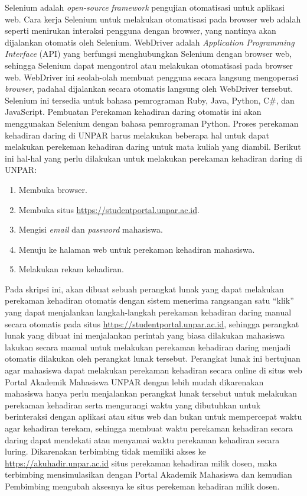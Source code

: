 Selenium adalah \textit{open-source} \textit{framework} pengujian otomatisasi untuk aplikasi web\cite{selenium}. Cara kerja Selenium untuk melakukan otomatisasi pada browser web adalah seperti menirukan interaksi pengguna dengan browser, yang nantinya akan dijalankan otomatis oleh Selenium. WebDriver adalah \textit{Application Programming Interface} (API) yang berfungsi menghubungkan Selenium dengan browser web, sehingga Selenium dapat mengontrol atau melakukan otomatisasi pada browser web. WebDriver ini seolah-olah membuat pengguna secara langsung mengoperasi \textit{browser}, padahal dijalankan secara otomatis langsung oleh WebDriver tersebut. Selenium ini tersedia untuk bahasa pemrograman Ruby, Java, Python, C\#, dan JavaScript. Pembuatan Perekaman kehadiran daring otomatis ini akan menggunakan Selenium dengan bahasa pemrograman Python.  
\newpage
Proses perekaman kehadiran daring di UNPAR harus melakukan beberapa hal untuk dapat melakukan perekeman kehadiran daring untuk mata kuliah yang diambil. Berikut ini hal-hal yang perlu dilakukan untuk melakukan perekaman kehadiran daring di UNPAR:
\begin{enumerate}
	\item Membuka browser.
	\item Membuka situs \url{https://studentportal.unpar.ac.id}.
	\item Mengisi \textit{email} dan \textit{password} mahasiswa.
	\item Menuju ke halaman web untuk perekaman kehadiran mahasiswa.
	\item Melakukan rekam kehadiran.
\end{enumerate}
Pada skripsi ini, akan dibuat sebuah perangkat lunak yang dapat melakukan perekaman kehadiran otomatis dengan sistem menerima rangsangan satu ``klik'' yang dapat menjalankan langkah-langkah perekaman kehadiran daring manual secara otomatis pada situs \url{https://studentportal.unpar.ac.id}, sehingga perangkat lunak yang dibuat ini menjalankan perintah yang biasa dilakukan mahasiswa lakukan secara manual untuk melakukan perekaman kehadiran daring menjadi otomatis dilakukan oleh perangkat lunak tersebut.
Perangkat lunak ini bertujuan agar mahasiswa dapat melakukan perekaman kehadiran secara online di situs web Portal Akademik Mahasiswa UNPAR dengan lebih mudah dikarenakan mahasiswa hanya perlu menjalankan perangkat lunak tersebut untuk melakukan perekaman kehadiran serta mengurangi waktu yang dibutuhkan untuk berinteraksi dengan aplikasi atau situs web dan bukan untuk mempercepat waktu agar kehadiran terekam, sehingga membuat waktu perekaman kehadiran secara daring dapat mendekati atau menyamai waktu perekaman kehadiran secara luring. Dikarenakan terbimbing tidak memiliki akses ke \url{https://akuhadir.unpar.ac.id} situs perekaman kehadiran milik dosen, maka terbimbing mensimulasikan dengan Portal Akademik Mahasiswa dan kemudian Pembimbing mengubah aksesnya ke situs perekeman kehadiran milik dosen.


